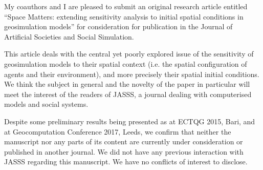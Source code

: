 \documentclass[11pt,a4paper,sans]{moderncv}        %
\begin{document}



% 





\justify
My coauthors and I are pleased to submit an original research article entitled ``Space Matters: extending sensitivity analysis to initial spatial conditions in geosimulation models'' for consideration for publication in the Journal of Artificial Societies and Social Simulation.

This article deals with the central yet poorly explored issue of the sensitivity of geosimulation models to their spatial context (i.e. the spatial configuration of agents and their environment), and more precisely their spatial initial conditions. We think the subject in general and the novelty of the paper in particular will meet the interest of the readers of JASSS, a journal dealing with computerised models and social systems.

Despite some preliminary results being presented as at ECTQG 2015, Bari, and at Geocomputation Conference 2017, Leeds, we confirm that neither the manuscript nor any parts of its content are currently under consideration or published in another journal. We did not have any previous interaction with JASSS regarding this manuscript. We have no conflicts of interest to disclose.
\end{document}
